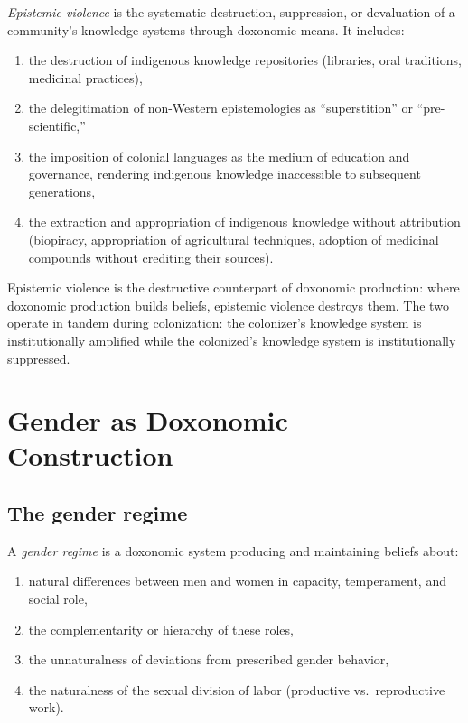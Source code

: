 \begin{definition}
\label{def:epistemic-violence}
\emph{Epistemic violence} is the systematic destruction, suppression, or devaluation of a community's knowledge systems through doxonomic means.
It includes:
\begin{enumerate}[nosep]
  \item the destruction of indigenous knowledge repositories (libraries, oral traditions, medicinal practices),
  \item the delegitimation of non-Western epistemologies as ``superstition'' or ``pre-scientific,''
  \item the imposition of colonial languages as the medium of education and governance, rendering indigenous knowledge inaccessible to subsequent generations,
  \item the extraction and appropriation of indigenous knowledge without attribution (biopiracy, appropriation of agricultural techniques, adoption of medicinal compounds without crediting their sources).
\end{enumerate}
\end{definition}

Epistemic violence is the destructive counterpart of doxonomic production: where doxonomic production builds beliefs, epistemic violence destroys them.
The two operate in tandem during colonization: the colonizer's knowledge system is institutionally amplified while the colonized's knowledge system is institutionally suppressed.

\section{Gender as Doxonomic Construction}
\label{sec:ch24b-gender}

\subsection{The gender regime}

\begin{definition}
\label{def:gender-regime}
A \emph{gender regime} is a doxonomic system producing and maintaining beliefs about:
\begin{enumerate}[nosep]
  \item natural differences between men and women in capacity, temperament, and social role,
  \item the complementarity or hierarchy of these roles,
  \item the unnaturalness of deviations from prescribed gender behavior,
  \item the naturalness of the sexual division of labor (productive vs.\ reproductive work).
\end{enumerate}
\end{definition}

